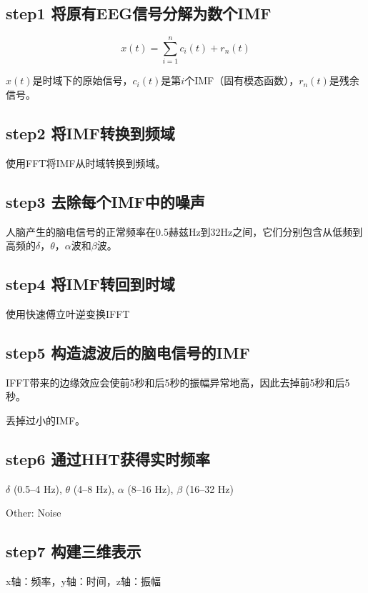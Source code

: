 \documentclass[cs4size,a4paper]{ctexart}
\numberwithin{equation}{section}
\numberwithin{table}{section}
\numberwithin{figure}{section}
\begin{document}

\subsection{step1 将原有EEG信号分解为数个IMF}

$$x(t)=\sum_{i=1}^{n} c_{i}(t)+r_{n}(t)$$

$x(t)$是时域下的原始信号，$c_i(t)$是第$i$个IMF（固有模态函数），$r_n(t)$是残余信号。

\subsection{step2 将IMF转换到频域}

使用FFT将IMF从时域转换到频域。

\subsection{step3 去除每个IMF中的噪声}

人脑产生的脑电信号的正常频率在0.5赫兹Hz到32Hz之间，它们分别包含从低频到高频的$\delta$，$\theta$，$\alpha$波和$\beta$波。

\subsection{step4 将IMF转回到时域}

使用快速傅立叶逆变换IFFT

\subsection{step5 构造滤波后的脑电信号的IMF}

IFFT带来的边缘效应会使前5秒和后5秒的振幅异常地高，因此去掉前5秒和后5秒。

丢掉过小的IMF。

\subsection{step6 通过HHT获得实时频率}

$\delta$ (0.5–4 Hz), $\theta$ (4–8 Hz), $\alpha$ (8–16 Hz), $\beta$ (16–32 Hz)

Other: Noise

\subsection{step7 构建三维表示}

x轴：频率，y轴：时间，z轴：振幅
\end{document}
